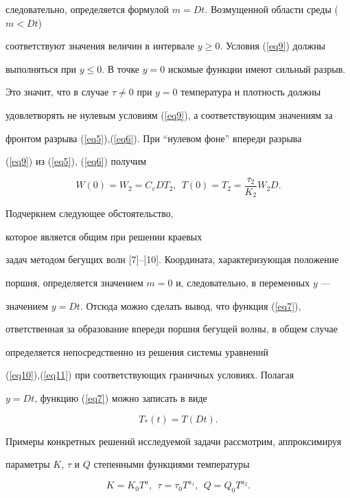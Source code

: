 следовательно, определяется формулой $m=Dt$. Возмущенной области среды ($m<Dt$)


соответствуют значения величин в интервале $y\ge0$. Условия (\ref{eq9}) должны


выполняться при $y\le0$. В точке $y=0$ искомые функции имеют сильный разрыв.


Это значит, что в случае $\tau\ne0$ при $y=0$ температура и плотность должны


удовлетворять не нулевым условиям (\ref{eq9}), а соответствующим значениям за


фронтом разрыва (\ref{eq5}),(\ref{eq6}). При ``нулевом фоне'' впереди разрыва


(\ref{eq9}) из (\ref{eq5}), (\ref{eq6}) получим 


$$


W(0)=W_2=C_vDT_2,\ \ T(0)=T_2=\frac{\tau_2}{K_2}W_2D.


$$





Подчеркнем следующее обстоятельство, 


которое является общим при решении краевых


задач методом бегущих волн [7]--[10]. Координата, характеризующая положение


поршня, определяется значением $m=0$ и, следовательно, в переменных $y$ ---


значением $y=Dt$. Отсюда можно сделать вывод, что функция (\ref{eq7}),


ответственная за образование впереди поршня бегущей волны, в общем случае


определяется непосредственно из решения системы уравнений


(\ref{eq10}),(\ref{eq11}) при соответствующих граничных условиях. Полагая


$y=Dt$, функцию (\ref{eq7}) можно записать в виде


$$


T_*(t)=T(Dt).


$$





Примеры конкретных решений исследуемой задачи рассмотрим, аппроксимируя


параметры $K$, $\tau$ и $Q$ степенными функциями температуры


\begin{equation}\label{eq13}


K=K_0T^a,\ \ \tau=\tau_0T^{a_1},\ \ Q=Q_0T^{a_2}.


\end{equation}


